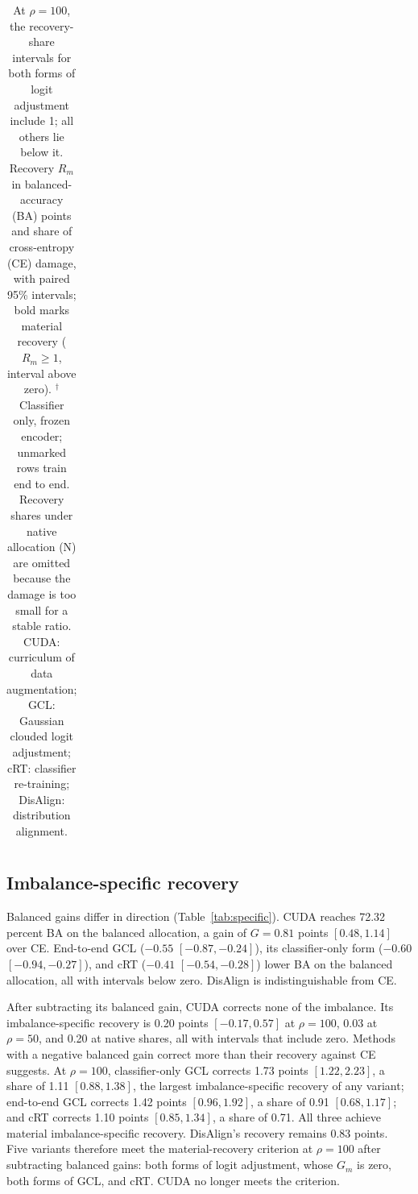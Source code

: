 \begin{table}[t]
{\begin{tabular}{@{}lccccc@{}}
\bottomrule
\end{tabular}}
\caption{At $\rho=100$, the recovery-share intervals for both forms of logit adjustment include 1; all others lie below it. Recovery $R_m$ in balanced-accuracy (BA) points and share of cross-entropy (CE) damage, with paired 95\% intervals; bold marks material recovery ($R_m\geq1$, interval above zero). $^{\dagger}$Classifier only, frozen encoder; unmarked rows train end to end. Recovery shares under native allocation (N) are omitted because the damage is too small for a stable ratio. CUDA: curriculum of data augmentation; GCL: Gaussian clouded logit adjustment; cRT: classifier re-training; DisAlign: distribution alignment.}
\label{tab:recovery}
\end{table}

\subsection{Imbalance-specific recovery}
Balanced gains differ in direction (Table~\ref{tab:specific}). CUDA reaches 72.32 percent BA on the balanced allocation, a gain of $G=0.81$ points $[0.48, 1.14]$ over CE. End-to-end GCL ($-0.55$ $[-0.87, -0.24]$), its classifier-only form ($-0.60$ $[-0.94, -0.27]$), and cRT ($-0.41$ $[-0.54, -0.28]$) lower BA on the balanced allocation, all with intervals below zero. DisAlign is indistinguishable from CE.

After subtracting its balanced gain, CUDA corrects none of the imbalance. Its imbalance-specific recovery is 0.20 points $[-0.17, 0.57]$ at $\rho=100$, 0.03 at $\rho=50$, and 0.20 at native shares, all with intervals that include zero. Methods with a negative balanced gain correct more than their recovery against CE suggests. At $\rho=100$, classifier-only GCL corrects 1.73 points $[1.22, 2.23]$, a share of 1.11 $[0.88, 1.38]$, the largest imbalance-specific recovery of any variant; end-to-end GCL corrects 1.42 points $[0.96, 1.92]$, a share of 0.91 $[0.68, 1.17]$; and cRT corrects 1.10 points $[0.85, 1.34]$, a share of 0.71. All three achieve material imbalance-specific recovery. DisAlign's recovery remains 0.83 points. Five variants therefore meet the material-recovery criterion at $\rho=100$ after subtracting balanced gains: both forms of logit adjustment, whose $G_m$ is zero, both forms of GCL, and cRT. CUDA no longer meets the criterion.

